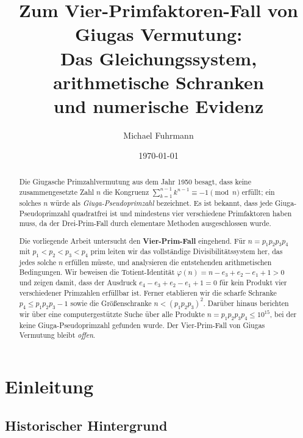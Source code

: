 \documentclass[12pt,a4paper]{amsart}
\theoremstyle{definition}
\begin{document}

\title{Zum Vier-Primfaktoren-Fall von Giugas Vermutung:\\
       Das Gleichungssystem, arithmetische Schranken\\
       und numerische Evidenz}

\author{Michael Fuhrmann}
\address{Specialist Mathematics Project, Build 133}
\date{\today}

\begin{abstract}
Die Giugasche Primzahlvermutung aus dem Jahr 1950 besagt, dass keine
zusammengesetzte Zahl $n$ die Kongruenz $\sum_{k=1}^{n-1} k^{n-1} \equiv -1
\pmod{n}$ erfüllt; ein solches $n$ würde als \emph{Giuga-Pseudoprimzahl}
bezeichnet.  Es ist bekannt, dass jede Giuga-Pseudoprimzahl quadratfrei ist
und mindestens vier verschiedene Primfaktoren haben muss, da der Drei-Prim-Fall
durch elementare Methoden ausgeschlossen wurde.

Die vorliegende Arbeit untersucht den \textbf{Vier-Prim-Fall} eingehend.
Für $n = p_1 p_2 p_3 p_4$ mit $p_1 < p_2 < p_3 < p_4$ prim leiten wir das
vollständige Divisibilitätssystem her, das jedes solche $n$ erfüllen müsste,
und analysieren die entstehenden arithmetischen Bedingungen.  Wir beweisen die
Totient-Identität $\varphi(n) = n - e_3 + e_2 - e_1 + 1 > 0$ und zeigen
damit, dass der Ausdruck $e_4 - e_3 + e_2 - e_1 + 1 = 0$ für kein Produkt
vier verschiedener Primzahlen erfüllbar ist.  Ferner etablieren wir die scharfe
Schranke $p_4 \le p_1 p_2 p_3 - 1$ sowie die Größenschranke
$n < (p_1 p_2 p_3)^2$.  Darüber hinaus berichten wir über eine
computergestützte Suche über alle Produkte $n = p_1 p_2 p_3 p_4 \le 10^{15}$,
bei der keine Giuga-Pseudoprimzahl gefunden wurde.
Der Vier-Prim-Fall von Giugas Vermutung bleibt \emph{offen}.
\end{abstract}

\maketitle
\tableofcontents

\section{Einleitung}
\label{sec:einleitung}

\subsection{Historischer Hintergrund}
\end{document}
